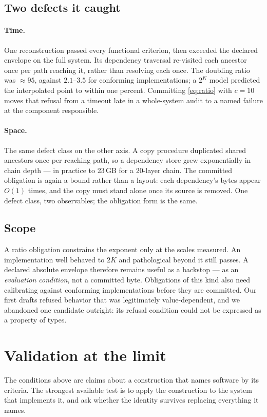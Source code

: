 \documentclass[10pt,twocolumn,letterpaper]{article}
\begin{document}
\subsection{Two defects it caught}
\paragraph{Time.} One reconstruction passed every functional criterion, then exceeded the declared envelope on the full system. Its dependency traversal re-visited each ancestor once per path reaching it, rather than resolving each once. The doubling ratio was $\approx\!95$, against $2.1$--$3.5$ for conforming implementations; a $2^K$ model predicted the interpolated point to within one percent. Committing \eqref{eq:ratio} with $c=10$ moves that refusal from a timeout late in a whole-system audit to a named failure at the component responsible.

\paragraph{Space.} The same defect class on the other axis. A copy procedure duplicated shared ancestors once per reaching path, so a dependency store grew exponentially in chain depth --- in practice to 23\,GB for a 20-layer chain. The committed obligation is again a bound rather than a layout: each dependency's bytes appear $O(1)$ times, and the copy must stand alone once its source is removed. One defect class, two observables; the obligation form is the same.

\subsection{Scope}
A ratio obligation constrains the exponent only at the scales measured. An implementation well behaved to $2K$ and pathological beyond it still passes. A declared absolute envelope therefore remains useful as a backstop --- as an \emph{evaluation condition}, not a committed byte. Obligations of this kind also need calibrating against conforming implementations before they are committed. Our first drafts refused behavior that was legitimately value-dependent, and we abandoned one candidate outright: its refusal condition could not be expressed as a property of types.

\section{Validation at the limit}
\label{sec:selfhost}
The conditions above are claims about a construction that names software by its criteria. The strongest available test is to apply the construction to the system that implements it, and ask whether the identity survives replacing everything it names.
\end{document}
